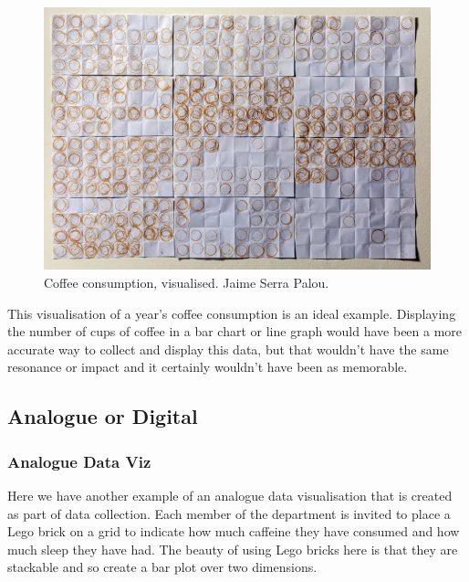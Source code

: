 \documentclass[
  12pt,
]{book}
\begin{document}
\begin{figure}
\includegraphics[width=1\linewidth]{images/303-data-visualisation/coffee-2} \caption{Coffee consumption, visualised. Jaime Serra Palou.}\label{fig:unnamed-chunk-2}
\end{figure}

This visualisation of a year's coffee consumption is an ideal example. Displaying the number of cups of coffee in a bar chart or line graph would have been a more accurate way to collect and display this data, but that wouldn't have the same resonance or impact and it certainly wouldn't have been as memorable.

\hypertarget{analogue-or-digital}{%
\subsection{Analogue or Digital}\label{analogue-or-digital}}

\hypertarget{analogue-data-viz}{%
\subsubsection{Analogue Data Viz}\label{analogue-data-viz}}

Here we have another example of an analogue data visualisation that is created as part of data collection. Each member of the department is invited to place a Lego brick on a grid to indicate how much caffeine they have consumed and how much sleep they have had. The beauty of using Lego bricks here is that they are stackable and so create a bar plot over two dimensions.
\end{document}
